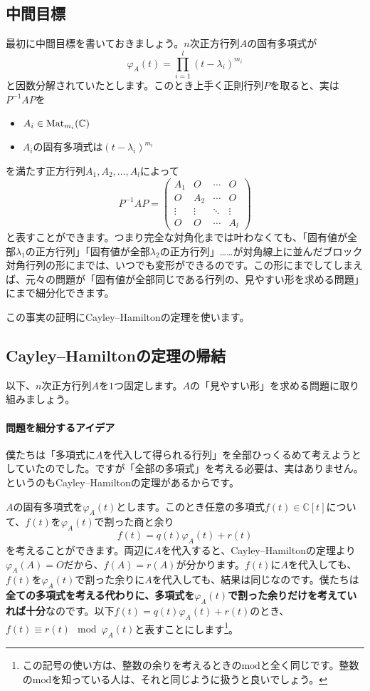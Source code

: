 \subsection{中間目標}

最初に中間目標を書いておきましょう。$n$次正方行列$A$の固有多項式が
\[
\varphi_A(t) = \prod_{i = 1}^{l} (t - \lambda_i)^{m_i}
\]
と因数分解されていたとします。このとき上手く正則行列$P$を取ると、実は$P^{-1} A P$を
\begin{itemize}
\item $A_i \in \operatorname{Mat}_{m_i}(\mathbb{C})$
\item $A_i$の固有多項式は$(t - \lambda_i)^{m_i}$
\end{itemize}
を満たす正方行列$A_1, A_2, \ldots, A_l$によって
\[
P^{-1} A P =
\begin{pmatrix}
A_1 & O & \cdots & O \\
O & A_2 & \cdots & O \\
\vdots & \vdots & \ddots & \vdots \\
O & O & \cdots & A_l
\end{pmatrix}
\]
と表すことができます。つまり完全な対角化までは叶わなくても、「固有値が全部$\lambda_1$の正方行列」「固有値が全部$\lambda_2$の正方行列」……が対角線上に並んだブロック対角行列の形にまでは、いつでも変形ができるのです。この形にまでしてしまえば、元々の問題が「固有値が全部同じである行列の、見やすい形を求める問題」にまで細分化できます。

この事実の証明にCayley--Hamiltonの定理を使います。

\subsection{Cayley--Hamiltonの定理の帰結}

以下、$n$次正方行列$A$を$1$つ固定します。$A$の「見やすい形」を求める問題に取り組みましょう。

\paragraph{問題を細分するアイデア}

僕たちは「多項式に$A$を代入して得られる行列」を全部ひっくるめて考えようとしていたのでした。ですが「全部の多項式」を考える必要は、実はありません。というのもCayley--Hamiltonの定理があるからです。

$A$の固有多項式を$\varphi_A(t)$とします。このとき任意の多項式$f(t) \in \mathbb{C}[t]$について、$f(t)$を$\varphi_A(t)$で割った商と余り
\[
f(t) = q(t) \varphi_A(t) + r(t)
\]
を考えることができます。両辺に$A$を代入すると、Cayley--Hamiltonの定理より$\varphi_A(A) = O$だから、$f(A) = r(A)$が分かります。$f(t)$に$A$を代入しても、$f(t)$を$\varphi_A(t)$で割った余りに$A$を代入しても、結果は同じなのです。僕たちは\textbf{全ての多項式を考える代わりに、多項式を$\varphi_A(t)$で割った余りだけを考えていれば十分}なのです。以下$f(t) = q(t) \varphi_A(t) + r(t)$のとき、$f(t) \equiv r(t) \mod \varphi_A(t)$と表すことにします\footnote{この記号の使い方は、整数の余りを考えるときの$\mathrm{mod}$と全く同じです。整数の$\mathrm{mod}$を知っている人は、それと同じように扱うと良いでしょう。}。

